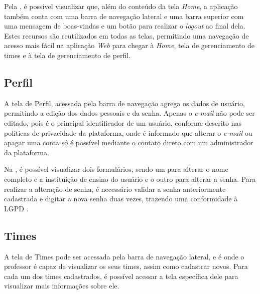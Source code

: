 

Pela , é possível visualizar que, além do conteúdo da tela \textit{Home}, a aplicação também conta com uma barra de navegação lateral e uma barra superior com uma mensagem de boas-vindas e um botão para realizar o \textit{logout} ao final dela. Estes recursos são reutilizados em todas as telas, permitindo uma navegação de acesso mais fácil na aplicação \textit{Web} para chegar à \textit{Home}, tela de gerenciamento de times e à tela de gerenciamento de perfil.

\subsection{Perfil}

A tela de Perfil, acessada pela barra de navegação agrega os dados de usuário, permitindo a edição dos dados pessoais e da senha. Apenas o \textit{e-mail} não pode ser editado, pois é o principal identificador de um usuário, conforme descrito nas políticas de privacidade da plataforma, onde é informado que alterar o \textit{e-mail} ou apagar uma conta só é possível mediante o contato direto com um administrador da plataforma.


Na , é possível visualizar dois formulários, sendo um para alterar o nome completo e a instituição de ensino do usuário e o outro para alterar a senha. Para realizar a alteração de senha, é necessário validar a senha anteriormente cadastrada e digitar a nova senha duas vezes, trazendo uma conformidade à LGPD \cite{lgpd}.

\subsection{Times}

A tela de Times pode ser acessada pela barra de navegação lateral, e é onde o professor é capaz de visualizar os seus times, assim como cadastrar novos. Para cada um dos times cadastrados, é possível acessar a tela específica dele para visualizar mais informações sobre ele.

